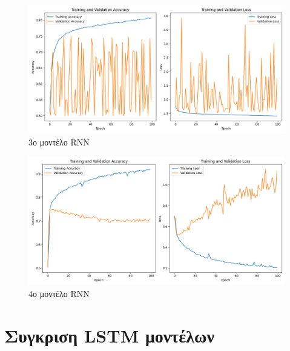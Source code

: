 \begin{figure}[ht]
	\centering
	\includegraphics[width=1\linewidth]{Results/RNN/rnn3.png}
	\caption{ 3ο μοντέλο RNN}
	\label{f:g3}	
\end{figure}

\begin{figure}[ht]
	\centering
	\includegraphics[width=1\linewidth]{Results/RNN/rnn4.png}
	\caption{ 4ο μοντέλο RNN }
	\label{f:g4}	
\end{figure}

\clearpage

\section{Συγκριση LSTM μοντέλων}

